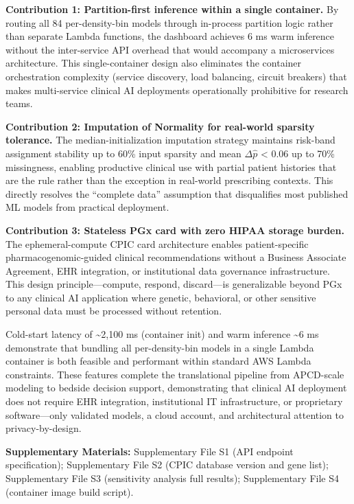 \documentclass[
  12pt,
]{book}
\begin{document}
\textbf{Contribution 1: Partition-first inference within a single
container.} By routing all 84 per-density-bin models through in-process
partition logic rather than separate Lambda functions, the dashboard
achieves 6 ms warm inference without the inter-service API overhead that
would accompany a microservices architecture. This single-container
design also eliminates the container orchestration complexity (service
discovery, load balancing, circuit breakers) that makes multi-service
clinical AI deployments operationally prohibitive for research teams.

\textbf{Contribution 2: Imputation of Normality for real-world sparsity
tolerance.} The median-initialization imputation strategy maintains
risk-band assignment stability up to 60\% input sparsity and mean
\textbar{}\(\Delta\hat{p}\)\textbar{} \textless{} 0.06 up to 70\%
missingness, enabling productive clinical use with partial patient
histories that are the rule rather than the exception in real-world
prescribing contexts. This directly resolves the ``complete data''
assumption that disqualifies most published ML models from practical
deployment.

\textbf{Contribution 3: Stateless PGx card with zero HIPAA storage
burden.} The ephemeral-compute CPIC card architecture enables
patient-specific pharmacogenomic-guided clinical recommendations without
a Business Associate Agreement, EHR integration, or institutional data
governance infrastructure. This design principle---compute, respond,
discard---is generalizable beyond PGx to any clinical AI application
where genetic, behavioral, or other sensitive personal data must be
processed without retention.

Cold-start latency of \textasciitilde2,100 ms (container init) and warm
inference \textasciitilde6 ms demonstrate that bundling all
per-density-bin models in a single Lambda container is both feasible and
performant within standard AWS Lambda constraints. These features
complete the translational pipeline from APCD-scale modeling to bedside
decision support, demonstrating that clinical AI deployment does not
require EHR integration, institutional IT infrastructure, or proprietary
software---only validated models, a cloud account, and architectural
attention to privacy-by-design.

\textbf{Supplementary Materials:} Supplementary File S1 (API endpoint
specification); Supplementary File S2 (CPIC database version and gene
list); Supplementary File S3 (sensitivity analysis full results);
Supplementary File S4 (container image build script).
\end{document}
